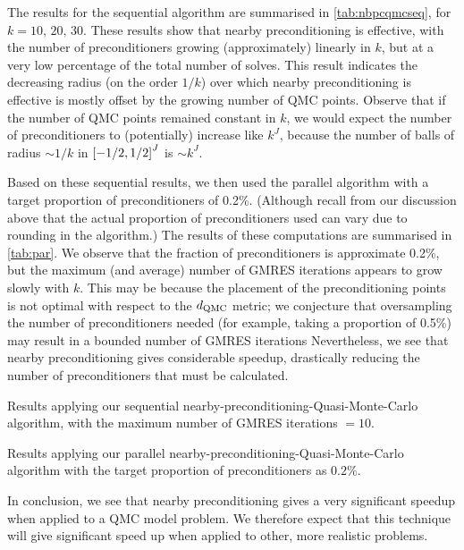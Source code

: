     The results for the sequential algorithm are summarised in \cref{tab:nbpcqmcseq}, for $k = 10,\,20,\,30$. These results show that nearby preconditioning is effective, with the number of preconditioners growing (approximately) linearly in $k$, but at a very low percentage of the total number of solves. This result indicates the decreasing radius (on the order $1/k$) over which nearby preconditioning is effective is mostly offset by the growing number of QMC points. Observe that if the number of QMC points remained constant in $k$, we would expect the number of preconditioners to (potentially) increase like $k^J$, because the number of balls of radius $\sim 1/k$ in $\cube{J}$ is $\sim k^J.$

    Based on these sequential results, we then used the parallel algorithm with a target proportion of preconditioners of 0.2\%. (Although recall from our discussion above that the actual proportion of preconditioners used can vary due to rounding in the algorithm.) The results of these computations are summarised in \cref{tab:par}. We observe that the fraction of preconditioners is approximate 0.2\%, but the maximum (and average) number of GMRES iterations appears to grow slowly with $k.$ This may be because the placement of the preconditioning points is not optimal with respect to the $d_{\mathrm{QMC}}$ metric; we conjecture that oversampling the number of preconditioners needed (for example, taking a proportion of 0.5\%) may result in a bounded number of GMRES iterations Nevertheless, we see that nearby preconditioning gives considerable speedup, drastically reducing the number of preconditioners that must be calculated.

    \begin{table}
  \centering
  
  \caption{Results applying our sequential nearby-preconditioning-Quasi-Monte-Carlo algorithm, with the maximum number of GMRES iterations $=10$.}\label{tab:nbpcqmcseq}
\end{table}

\begin{table}
  \centering
  
  \caption{Results applying our parallel nearby-preconditioning-Quasi-Monte-Carlo algorithm with the target proportion of preconditioners as $0.2$\%.}\label{tab:nbpcqmcspar}
  \end{table}


    In conclusion, we see that nearby preconditioning gives a very significant speedup when applied to a QMC model problem. We therefore expect that this technique will give significant speed up when applied to other, more realistic problems.
    

